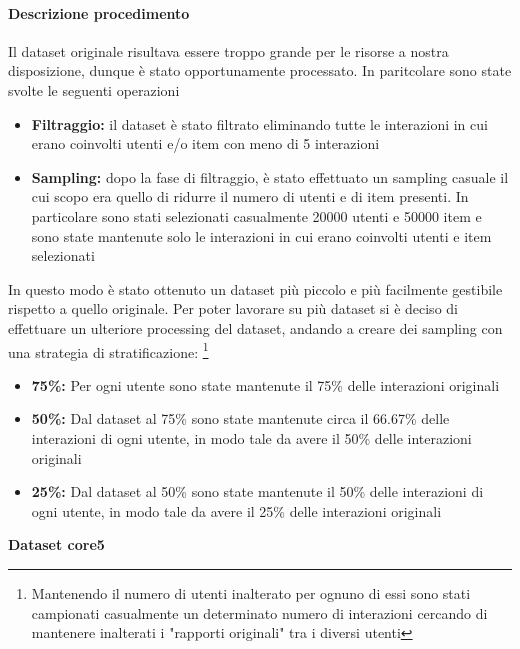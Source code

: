 \paragraph{Descrizione procedimento}


\noindent Il dataset originale risultava essere troppo grande per le risorse a nostra disposizione, dunque è stato opportunamente processato. In paritcolare sono state svolte le seguenti operazioni
\begin{itemize}
    \item \textbf{Filtraggio:} il dataset è stato filtrato eliminando tutte le interazioni in cui erano coinvolti utenti e/o item con meno di 5 interazioni
    \item \textbf{Sampling:} dopo la fase di filtraggio, è stato effettuato un sampling casuale il cui scopo era quello di ridurre il numero di utenti e di item presenti. In particolare sono stati selezionati casualmente 20000 utenti e 50000 item e sono state mantenute solo le interazioni in cui erano coinvolti utenti e item selezionati
\end{itemize}

\noindent In questo modo è stato ottenuto un dataset più piccolo e più facilmente gestibile rispetto a quello originale.
Per poter lavorare su più dataset si è deciso di effettuare un ulteriore processing del dataset, andando a creare dei sampling con una strategia di stratificazione: \footnote{{{Mantenendo il numero di utenti inalterato per ognuno di essi sono stati campionati casualmente un determinato numero di interazioni cercando di mantenere inalterati i "rapporti originali" tra i diversi utenti}}}{}
\begin{itemize}
    \item \textbf{75\%:} Per ogni utente sono state mantenute il 75\% delle interazioni originali
    \item \textbf{50\%:} Dal dataset al 75\% sono state mantenute circa il 66.67\% delle interazioni di ogni utente, in modo tale da avere il 50\% delle interazioni originali
    \item \textbf{25\%:} Dal dataset al 50\% sono state mantenute il 50\% delle interazioni di ogni utente, in modo tale da avere il 25\% delle interazioni originali
\end{itemize}

\noindent\textbf{Dataset core5}


